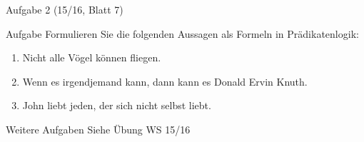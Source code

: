 \begin{frame}{Aufgabe 2 (15/16, Blatt 7)}
	\begin{block}{Aufgabe}
		Formulieren Sie die folgenden Aussagen als Formeln in Prädikatenlogik:
		\begin{enumerate}
			\item Nicht alle Vögel können fliegen.
			\item Wenn es irgendjemand kann, dann kann es Donald Ervin Knuth.
			\item John liebt jeden, der sich nicht selbst liebt.
		\end{enumerate}
	\end{block}
	
\end{frame}

\begin{frame}{Weitere Aufgaben}
	Siehe Übung WS 15/16
\end{frame}